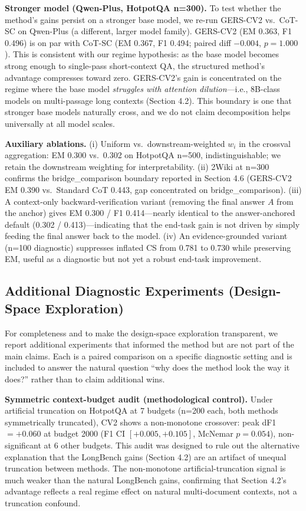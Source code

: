 \documentclass[11pt,a4paper]{article}
\begin{document}
\textbf{Stronger model (Qwen-Plus, HotpotQA n=300).} To test whether the method's gains persist on a stronger base model, we re-run GERS-CV2 vs.\ CoT-SC on Qwen-Plus (a different, larger model family). GERS-CV2 (EM 0.363, F1 0.496) is on par with CoT-SC (EM 0.367, F1 0.494; paired diff $-0.004$, $p=1.000$). This is consistent with our regime hypothesis: as the base model becomes strong enough to single-pass short-context QA, the structured method's advantage compresses toward zero. GERS-CV2's gain is concentrated on the regime where the base model \emph{struggles with attention dilution}---i.e., 8B-class models on multi-passage long contexts (Section 4.2). This boundary is one that stronger base models naturally cross, and we do not claim decomposition helps universally at all model scales.

\textbf{Auxiliary ablations.} (i) Uniform vs.\ downstream-weighted $w_i$ in the crossval aggregation: EM 0.300 vs.\ 0.302 on HotpotQA n=500, indistinguishable; we retain the downstream weighting for interpretability. (ii) 2Wiki at n=300 confirms the bridge\_comparison boundary reported in Section 4.6 (GERS-CV2 EM 0.390 vs.\ Standard CoT 0.443, gap concentrated on bridge\_comparison). (iii) A context-only backward-verification variant (removing the final answer $A$ from the anchor) gives EM 0.300 / F1 0.414---nearly identical to the answer-anchored default (0.302 / 0.413)---indicating that the end-task gain is not driven by simply feeding the final answer back to the model. (iv) An evidence-grounded variant (n=100 diagnostic) suppresses inflated CS from 0.781 to 0.730 while preserving EM, useful as a diagnostic but not yet a robust end-task improvement.

\subsection{Additional Diagnostic Experiments (Design-Space Exploration)}
\label{sec:additional_diagnostics}

For completeness and to make the design-space exploration transparent, we report additional experiments that informed the method but are not part of the main claims. Each is a paired comparison on a specific diagnostic setting and is included to answer the natural question ``why does the method look the way it does?'' rather than to claim additional wins.

\textbf{Symmetric context-budget audit (methodological control).} Under artificial truncation on HotpotQA at 7 budgets (n=200 each, both methods symmetrically truncated), CV2 shows a non-monotone crossover: peak dF1 $=+0.060$ at budget 2000 (F1 CI $[+0.005, +0.105]$, McNemar $p=0.054$), non-significant at 6 other budgets. This audit was designed to rule out the alternative explanation that the LongBench gains (Section 4.2) are an artifact of unequal truncation between methods. The non-monotone artificial-truncation signal is much weaker than the natural LongBench gains, confirming that Section 4.2's advantage reflects a real regime effect on natural multi-document contexts, not a truncation confound.
\end{document}
